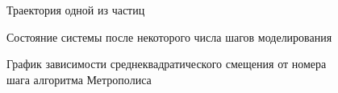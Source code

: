 \documentclass[14pt,a4paper,report]{ncc}
\begin{document}
{\begin{figure}[h!]
\caption{Траектория одной из частиц}
\label{ris:image12}
\end{figure}
  \begin{figure}[h!]
\caption{Состояние системы после некоторого числа шагов моделирования}
\label{ris:image13}
\end{figure}
  \begin{figure}[h!]
\caption{График зависимости среднеквадратического смещения от номера шага алгоритма Метрополиса}
\label{ris:image14}
\end{figure}

}
\end{document}
